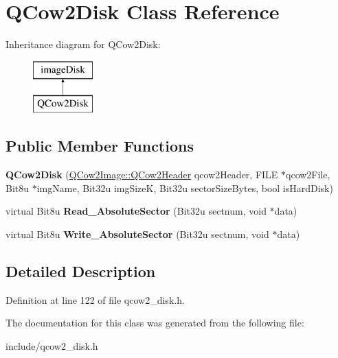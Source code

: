 \hypertarget{classQCow2Disk}{\section{Q\-Cow2\-Disk Class Reference}
\label{classQCow2Disk}
}
Inheritance diagram for Q\-Cow2\-Disk\-:\begin{figure}[H]
\begin{center}
\leavevmode
\includegraphics[height=2.000000cm]{classQCow2Disk}
\end{center}
\end{figure}
\subsection*{Public Member Functions}
\begin{DoxyCompactItemize}
\item 
\hypertarget{classQCow2Disk_ab5c7ce6db2758362d56c1ee4d9823003}{{\bfseries Q\-Cow2\-Disk} (\hyperlink{structQCow2Image_1_1QCow2Header}{Q\-Cow2\-Image\-::\-Q\-Cow2\-Header} qcow2\-Header, F\-I\-L\-E $\ast$qcow2\-File, Bit8u $\ast$img\-Name, Bit32u img\-Size\-K, Bit32u sector\-Size\-Bytes, bool is\-Hard\-Disk)}\label{classQCow2Disk_ab5c7ce6db2758362d56c1ee4d9823003}

\item 
\hypertarget{classQCow2Disk_a689fa62b0b57eead64eedc140309e446}{virtual Bit8u {\bfseries Read\-\_\-\-Absolute\-Sector} (Bit32u sectnum, void $\ast$data)}\label{classQCow2Disk_a689fa62b0b57eead64eedc140309e446}

\item 
\hypertarget{classQCow2Disk_a95dc70621c2f98bc7e777156014b2c8b}{virtual Bit8u {\bfseries Write\-\_\-\-Absolute\-Sector} (Bit32u sectnum, void $\ast$data)}\label{classQCow2Disk_a95dc70621c2f98bc7e777156014b2c8b}

\end{DoxyCompactItemize}


\subsection{Detailed Description}


Definition at line 122 of file qcow2\-\_\-disk.\-h.



The documentation for this class was generated from the following file\-:\begin{DoxyCompactItemize}
\item 
include/qcow2\-\_\-disk.\-h\end{DoxyCompactItemize}
